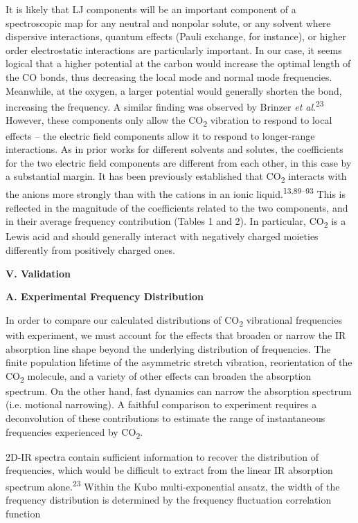 \documentclass[]{article}
\begin{document}
It is likely that LJ components will be an important component of a spectroscopic map for any neutral and nonpolar solute, or any solvent where dispersive interactions, quantum effects (Pauli exchange, for instance), or higher order electrostatic interactions are particularly important. In our case, it seems logical that a higher potential at the carbon would increase the optimal length of the CO bonds, thus decreasing the local mode and normal mode frequencies. Meanwhile, at the oxygen, a larger potential would generally shorten the bond, increasing the frequency. A similar finding was observed by Brinzer \emph{et al}.\textsuperscript{23} However, these components only allow the CO\textsubscript{2} vibration to respond to local effects -- the electric field components allow it to respond to longer-range interactions. As in prior works for different solvents and solutes, the coefficients for the two electric field components are different from each other, in this case by a substantial margin. It has been previously established that CO\textsubscript{2} interacts with the anions more strongly than with the cations in an ionic liquid.\textsuperscript{13,89--93} This is reflected in the magnitude of the coefficients related to the two components, and in their average frequency contribution (Tables 1 and 2). In particular, CO\textsubscript{2} is a Lewis acid and should generally interact with negatively charged moieties differently from positively charged ones.

\textbf{V. Validation }

\textbf{A. Experimental Frequency Distribution }

In order to compare our calculated distributions of CO\textsubscript{2} vibrational frequencies with experiment, we must account for the effects that broaden or narrow the IR absorption line shape beyond the underlying distribution of frequencies. The finite population lifetime of the asymmetric stretch vibration, reorientation of the CO\textsubscript{2} molecule, and a variety of other effects can broaden the absorption spectrum. On the other hand, fast dynamics can narrow the absorption spectrum (i.e. motional narrowing). A faithful comparison to experiment requires a deconvolution of these contributions to estimate the range of instantaneous frequencies experienced by CO\textsubscript{2}.

2D-IR spectra contain sufficient information to recover the distribution of frequencies, which would be difficult to extract from the linear IR absorption spectrum alone.\textsuperscript{23} Within the Kubo multi-exponential ansatz, the width of the frequency distribution is determined by the frequency fluctuation correlation function
\end{document}
